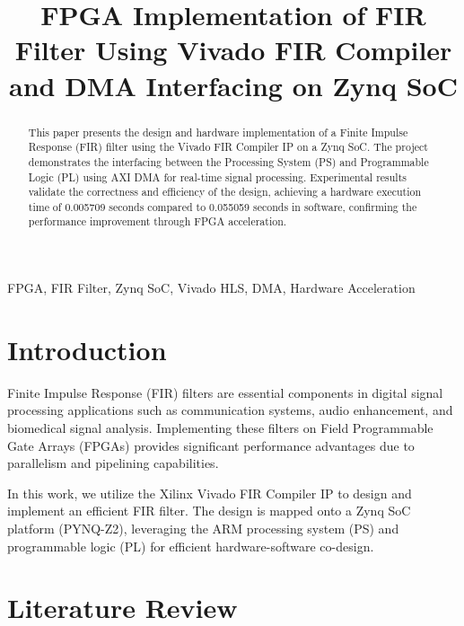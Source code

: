 \documentclass[conference]{IEEEtran}
\begin{document}
	
	\title{FPGA Implementation of FIR Filter Using Vivado FIR Compiler and DMA Interfacing on Zynq SoC}
	
	\author{
	}
	
	\maketitle
	
	\begin{abstract}
		This paper presents the design and hardware implementation of a Finite Impulse Response (FIR) filter using the Vivado FIR Compiler IP on a Zynq SoC. The project demonstrates the interfacing between the Processing System (PS) and Programmable Logic (PL) using AXI DMA for real-time signal processing. Experimental results validate the correctness and efficiency of the design, achieving a hardware execution time of 0.005709 seconds compared to 0.055059 seconds in software, confirming the performance improvement through FPGA acceleration.
	\end{abstract}
	
	\begin{IEEEkeywords}
		FPGA, FIR Filter, Zynq SoC, Vivado HLS, DMA, Hardware Acceleration
	\end{IEEEkeywords}
	
	\section{Introduction}
	Finite Impulse Response (FIR) filters are essential components in digital signal processing applications such as communication systems, audio enhancement, and biomedical signal analysis. Implementing these filters on Field Programmable Gate Arrays (FPGAs) provides significant performance advantages due to parallelism and pipelining capabilities.
	
	In this work, we utilize the Xilinx Vivado FIR Compiler IP to design and implement an efficient FIR filter. The design is mapped onto a Zynq SoC platform (PYNQ-Z2), leveraging the ARM processing system (PS) and programmable logic (PL) for efficient hardware-software co-design.
	
	\section{Literature Review}
	
\end{document}

